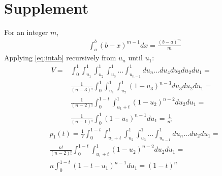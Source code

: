 \documentclass{llncs}
\begin{document}
\section*{Supplement}
\beginsupplement

For an integer $m$,
\begin{eqnarray}
&\displaystyle \int_a^b\left(b-x\right)^{m-1}dx=
\displaystyle \frac{\left(b-a\right)^m}{m}  \label{eq:intab}
\end{eqnarray} 
Applying \ref{eq:intab} recursively from $u_n$ until $u_1$: 
\begin{eqnarray}
V = &\displaystyle \int_0^1\int_{u_1}^1\int_{u_2}^1\int_{u_3}^1...\int_{u_{n-1}}^1 du_n...du_4 du_3 du_2 du_1 = \nonumber \\ 
&\displaystyle \frac{1}{(n-3)!}\int_0^1\int_{u_1}^1\int_{u_2}^1 \left( 1-u_3 \right)^{n-3}du_3 du_2 du_1 = \nonumber \\
&\displaystyle \frac{1}{(n-2)!}\int_0^{1-t}\int_{{u_1}+t}^1\left( 1-u_2 \right)^{n-2} du_2 du_1 = \nonumber \\
&\displaystyle \frac{1}{(n-1)!} \int_0^1\left( 1-u_1 \right)^{n-1} du_1 = \frac{1}{n!} \label{eq:volume}
\end{eqnarray} 
\begin{eqnarray}
& p_1(t) =  \displaystyle \frac{1}{V}\displaystyle \int_0^{1-t}\int_{{u_1}+t}^1\int_{u_2}^1\int_{u_3}^1...\int_{u_{n-1}}^1 du_n...du_2 du_1 =  \nonumber \\ 
&\displaystyle \frac{n!}{(n-2)!}\int_0^{1-t}\int_{{u_1}+t}^1\left( 1-u_2 \right)^{n-2} du_2 du_1 =  \nonumber \\
&\displaystyle n \int_0^{1-t}\left( 1-t-u_1 \right)^{n-1} du_1 = (1-t)^n \label{eq:p_1}
\end{eqnarray}
\end{document}
